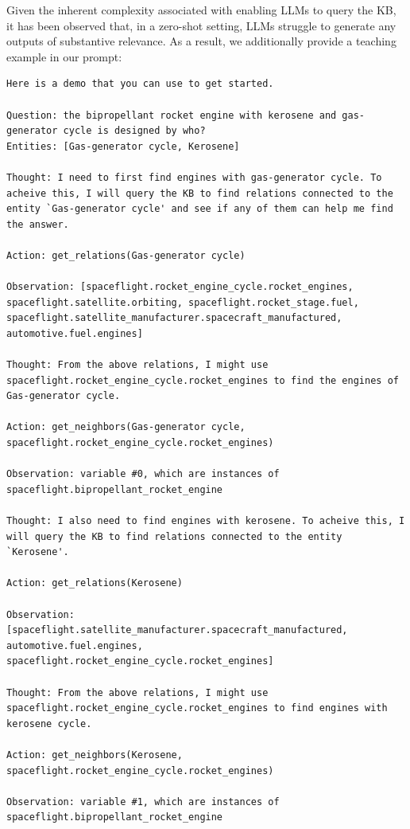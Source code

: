 Given the inherent complexity associated with enabling LLMs to query the KB, it has been observed that, in a zero-shot setting, LLMs struggle to generate any outputs of substantive relevance. 
As a result, we additionally provide a teaching example in our prompt:
\begin{lstlisting}
Here is a demo that you can use to get started.

Question: the bipropellant rocket engine with kerosene and gas-generator cycle is designed by who? 
Entities: [Gas-generator cycle, Kerosene]

Thought: I need to first find engines with gas-generator cycle. To acheive this, I will query the KB to find relations connected to the entity `Gas-generator cycle' and see if any of them can help me find the answer.

Action: get_relations(Gas-generator cycle)

Observation: [spaceflight.rocket_engine_cycle.rocket_engines, spaceflight.satellite.orbiting, spaceflight.rocket_stage.fuel, spaceflight.satellite_manufacturer.spacecraft_manufactured, automotive.fuel.engines]

Thought: From the above relations, I might use spaceflight.rocket_engine_cycle.rocket_engines to find the engines of Gas-generator cycle.

Action: get_neighbors(Gas-generator cycle, spaceflight.rocket_engine_cycle.rocket_engines)

Observation: variable #0, which are instances of spaceflight.bipropellant_rocket_engine

Thought: I also need to find engines with kerosene. To acheive this, I will query the KB to find relations connected to the entity `Kerosene'.

Action: get_relations(Kerosene)

Observation: [spaceflight.satellite_manufacturer.spacecraft_manufactured, automotive.fuel.engines, spaceflight.rocket_engine_cycle.rocket_engines]

Thought: From the above relations, I might use spaceflight.rocket_engine_cycle.rocket_engines to find engines with kerosene cycle.

Action: get_neighbors(Kerosene, spaceflight.rocket_engine_cycle.rocket_engines)

Observation: variable #1, which are instances of spaceflight.bipropellant_rocket_engine


\end{lstlisting}
